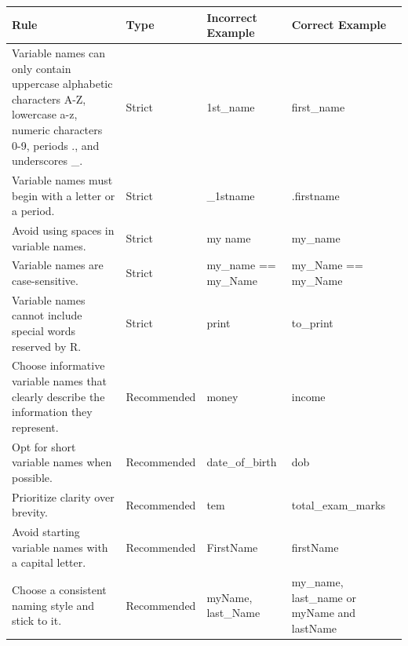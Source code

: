 \documentclass[
]{book}
\begin{document}
\begin{longtable}[]{@{}
  >{\raggedright\arraybackslash}p{}
  >{\raggedright\arraybackslash}p{}
  >{\raggedright\arraybackslash}p{}
  >{\raggedright\arraybackslash}p{}@{}}
\toprule\noalign{}
\begin{minipage}[b]{\linewidth}\raggedright
Rule
\end{minipage} & \begin{minipage}[b]{\linewidth}\raggedright
Type
\end{minipage} & \begin{minipage}[b]{\linewidth}\raggedright
Incorrect Example
\end{minipage} & \begin{minipage}[b]{\linewidth}\raggedright
Correct Example
\end{minipage} \\
\midrule\noalign{}
\endhead
\bottomrule\noalign{}
\endlastfoot
Variable names can only contain uppercase alphabetic characters A-Z, lowercase a-z, numeric characters 0-9, periods ., and underscores \_. & Strict & 1st\_name & first\_name \\
Variable names must begin with a letter or a period. & Strict & \_1stname & .firstname \\
Avoid using spaces in variable names. & Strict & my name & my\_name \\
Variable names are case-sensitive. & Strict & my\_name == my\_Name & my\_Name == my\_Name \\
Variable names cannot include special words reserved by R. & Strict & print & to\_print \\
Choose informative variable names that clearly describe the information they represent. & Recommended & money & income \\
Opt for short variable names when possible. & Recommended & date\_of\_birth & dob \\
Prioritize clarity over brevity. & Recommended & tem & total\_exam\_marks \\
Avoid starting variable names with a capital letter. & Recommended & FirstName & firstName \\
Choose a consistent naming style and stick to it. & Recommended & myName, last\_Name & my\_name, last\_name or myName and lastName \\
\end{longtable}
\end{document}

